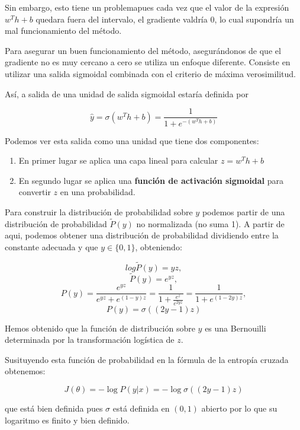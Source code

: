 		Sin embargo, esto tiene un problemapues cada vez que el valor de la expresión $w^Th + b$ quedara fuera del intervalo, el gradiente valdría 0, lo cual supondría un mal funcionamiento del método.
		
		Para asegurar un buen funcionamiento del método, asegurándonos de que el gradiente no es muy cercano a cero se utiliza un enfoque diferente. Consiste en utilizar una salida sigmoidal combinada con el criterio de máxima verosimilitud.
		
		Así, a salida de una unidad de salida sigmoidal estaría definida por 
		
		$$
			\hat{y} = \sigma (w^Th + b) = \frac{1}{1 + e^{-(w^Th + b)}}
		$$
		
		Podemos ver esta salida como una unidad que tiene dos componentes:
		\begin{enumerate}
			\item En primer lugar se aplica una capa lineal para calcular $z = w^Th + b$
			\item En segundo lugar se aplica una \textbf{función de activación sigmoidal} para convertir $z$ en una probabilidad.
		\end{enumerate}
		
		Para construir la distribución de probabilidad sobre $y$ podemos partir de una distribución de probabilidad $\tilde{P}(y)$ no normalizada (no suma 1). A partir de aqui, podemos obtener una distribución de probabilidad dividiendo entre la constante adecuada y que $y \in \{0,1\}$, obteniendo:
 		
 		$$
	 		log \tilde{P}(y) = yz,
	 	$$
	 	$$
		 	\tilde{P}(y) = e^{yz},
	 	$$
	 	$$
	 		P(y) = \frac{e^{yz}}{e^{yz} + e^{(1-y)z}} = \frac{1}{1 + \frac{e^z}{e^{2yz}}} = \frac{1}{1 + e^{(1-2y)z}},
	 	$$
	 	$$
	 		P(y) = \sigma((2y-1)z) 		
 		$$
 		
 		Hemos obtenido que la función de distribución sobre $y$ es una Bernouilli determinada por la transformación logística de $z$.
 		
 		Susituyendo esta función de probabilidad en la fórmula de la entropía cruzada obtenemos:
 		
 		$$
	 		J(\theta) = -\log P(y|x) = -\log \sigma((2y-1)z)  		
 		$$
 		
 		que está bien definida pues $\sigma$ está definida en $(0,1)$ abierto por lo que su logaritmo es finito y bien definido.
 		
